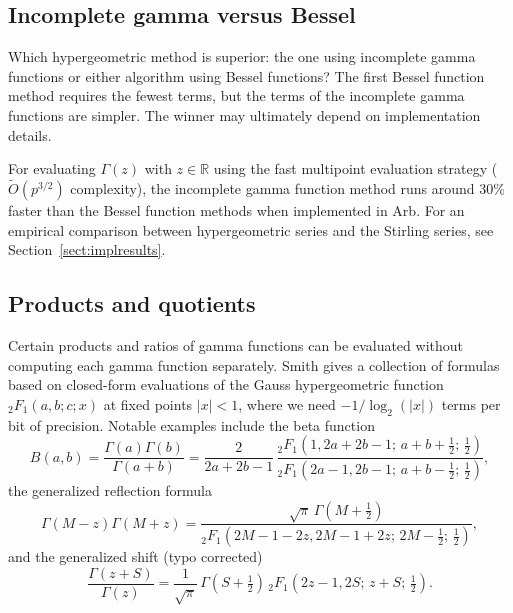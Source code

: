 \documentclass[reqno]{amsart}
\newcommand{\QQ}{\mathbb{Q}}
\newcommand{\RR}{\mathbb{R}}
\newcommand{\bigOtilde}{\widetilde O}
\theoremstyle{definition}
\begin{document}



\subsection{Incomplete gamma versus Bessel}

Which hypergeometric method is superior: the one using incomplete
gamma functions or either algorithm using Bessel functions?
The first Bessel function method requires the fewest
terms, but the terms of the incomplete gamma functions
are simpler. The winner may ultimately depend on implementation details.

For evaluating $\Gamma(z)$ with $z \in \RR$
using the fast multipoint evaluation strategy ($\bigOtilde(p^{3/2})$ complexity),
the incomplete gamma function method runs around 30\% faster than
the Bessel function methods when implemented in Arb.
For an empirical comparison between hypergeometric series
and the Stirling series, see Section~\ref{sect:implresults}.

\subsection{Products and quotients}

Certain products and ratios of gamma functions
can be evaluated without computing
each gamma function separately.
Smith \cite{smith2006gamma} gives a collection
of formulas based on closed-form evaluations
of the Gauss hypergeometric function
${}_2F_1(a,b; c; x)$ at fixed points $|x| < 1$,
where we need $-1/\log_2(|x|)$ terms per bit of precision.
Notable examples include the beta function
\begin{equation}
B(a,b) = \frac{\Gamma(a) \Gamma(b)}{\Gamma(a+b)} = \frac{2}{2a+2b-1} \, \frac{{}_2F_1(1, 2a+2b-1;\, a+b+\tfrac{1}{2};\, \tfrac{1}{2})}{{}_2F_1(2a-1, 2b-1;\, a+b-\tfrac{1}{2};\, \tfrac{1}{2})},
\label{eq:smithbeta}
\end{equation}
the generalized reflection formula
\begin{equation}
\Gamma(M-z) \Gamma(M+z) = \frac{\sqrt{\pi} \, \Gamma(M+\tfrac{1}{2})}{{}_2F_1(2M-1-2z, 2M-1+2z;\, 2M-\tfrac{1}{2};\, \tfrac{1}{2})},
\label{eq:smithreflection}
\end{equation}
and the generalized shift (typo corrected)
\begin{equation}
\frac{\Gamma(z+S)}{\Gamma(z)} = \frac{1}{\sqrt{\pi}} \, \Gamma(S+\tfrac{1}{2}) \, {}_2F_1(2z-1, 2S;\, z+S;\, \tfrac{1}{2}).
\label{eq:smithshift}
\end{equation}
\end{document}
